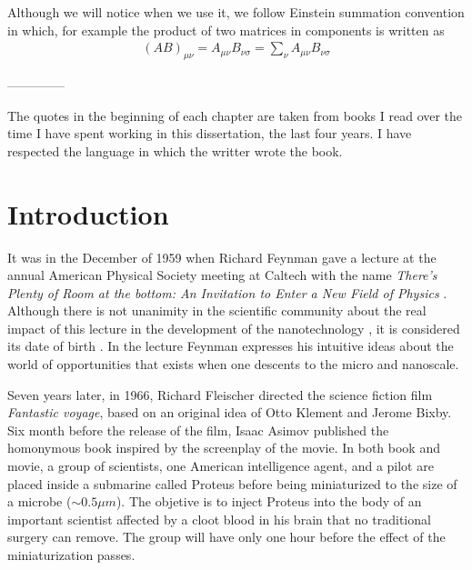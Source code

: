 \documentclass[b5paper,openright,10pt]{book}
\begin{document}
Although we will notice when we use it, we follow Einstein summation convention in which, for example the product of two matrices in components is written as
\begin{align}
    (AB)_{\mu\nu} = A_{\mu\nu}B_{\nu\sigma}=\sum_{\nu}A_{\mu\nu}B_{\nu\sigma} \nonumber
\end{align}

--------------

The quotes in the beginning of each chapter are taken from books I read over the time I have spent working in this dissertation, the last four years. I have respected the language in which the writter wrote the book. 

\setcounter{chapter}{-1}
\chapter{Introduction}
\label{Introduction}
\pagestyle{chapters}  %

It was in the December of 1959 when Richard Feynman gave a lecture at the annual American Physical Society meeting at Caltech with the name {\it There's Plenty of Room at the bottom: An Invitation to Enter a New Field of Physics} \cite{Feynman1960}. 
Although there is not unanimity in the scientific community about the real impact of this lecture in the development of the nanotechnology \cite{Nature2009}, it is considered its date of birth \cite{Tourney2008}. 
In the lecture Feynman expresses his intuitive ideas about the world of opportunities that exists when one descents to the micro and nanoscale. 

Seven years later, in 1966, Richard Fleischer directed the science fiction film {\it Fantastic voyage}, based on an original idea of Otto Klement and Jerome Bixby. 
Six month before the release of the film, Isaac Asimov published the homonymous book \cite{Asimov1966} inspired by the screenplay of the movie.  
In both book and movie, a group of scientists, one American intelligence agent, and a pilot are placed inside a submarine called Proteus before being miniaturized to the size of a microbe ($\sim 0.5 \mu m$). The objetive is to inject Proteus into the body of an important scientist affected by a cloot blood in his brain that no traditional surgery can remove. The group will have only one hour before the effect of the miniaturization passes.  
\end{document}
